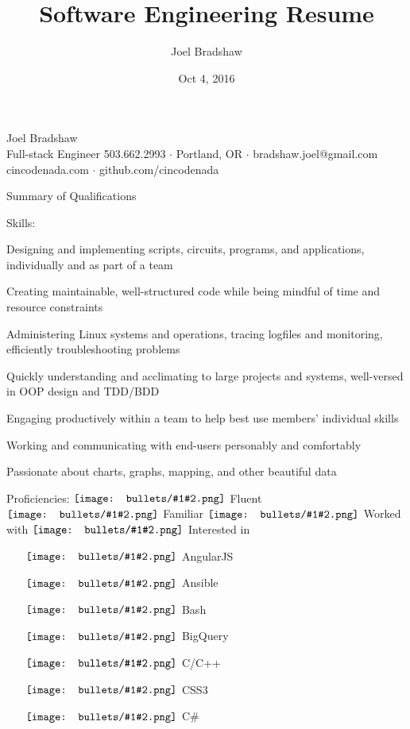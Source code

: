 \documentclass[letterpaper,10pt]{article}
\newcommand{\gbullet}[2][circle]{
  \vcenter{\hbox{\texttt{[image: bullets/\#1\#2.png]}}}
}
\begin{document}
\sffamily
\title{Software Engineering Resume}
\author{Joel Bradshaw}
\date{Oct 4, 2016}
\begin{center}
{\Huge Joel Bradshaw}\\
\vskip 2pt
{\large Full-stack Engineer}
\vskip 4pt
{\large
    503.662.2993 \ensuremath{\cdot} Portland, OR \ensuremath{\cdot} bradshaw.joel@gmail.com\\
    cincodenada.com \ensuremath{\cdot} github.com/cincodenada}
\end{center}
\vskip -8pt

\rmfamily
\begin{res_section}{Summary of Qualifications}
\begin{res_subsection}{Skills:}
  \item Designing and implementing scripts, circuits, programs, and applications, individually and as part of a team
  \item Creating maintainable, well-structured code while being mindful of time and resource constraints
  \item Administering Linux systems and operations, tracing logfiles and monitoring, efficiently troubleshooting problems
  \item Quickly understanding and acclimating to large projects and systems, well-versed in OOP design and TDD/BDD
  \item Engaging productively within a team to help best use members' individual skills
  \item Working and communicating with end-users personably and comfortably
  \item Passionate about charts, graphs, mapping, and other beautiful data
\end{res_subsection}
\begin{res_content}{Proficiencies: \small \hfill $\gbullet{4}$ Fluent $\gbullet{3}$ Familiar $\gbullet{2}$ Worked with $\gbullet{1}$ Interested in}
  \rmfamily
  \def \multicolsep {0pt}
  \setlength{\columnsep}{-8pt}
  \begin{multicols}{5}
  \begin{itemize}
    \item[$\gbullet{4}$] AngularJS
    \item[$\gbullet{3}$] Ansible
    \item[$\gbullet{3}$] Bash
    \item[$\gbullet{3}$] BigQuery
    \item[$\gbullet{3}$] C/C++
    \item[$\gbullet{4}$] CSS3
    \item[$\gbullet{3}$] C\#

\end{itemize}
\end{multicols}
\end{res_content}
\end{res_section}
\end{document}

